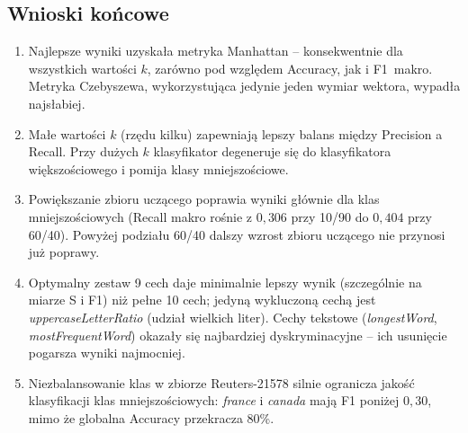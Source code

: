 \documentclass{article}
\begin{document}
\subsection{Wnioski końcowe}

\begin{enumerate}
    \item Najlepsze wyniki uzyskała metryka Manhattan -- konsekwentnie dla
    wszystkich wartości $k$, zarówno pod względem Accuracy, jak i F1~makro.
    Metryka Czebyszewa, wykorzystująca jedynie jeden wymiar wektora, wypadła
    najsłabiej.
    \item Małe wartości $k$ (rzędu kilku) zapewniają lepszy balans między
    Precision a Recall. Przy dużych $k$ klasyfikator degeneruje się do
    klasyfikatora większościowego i pomija klasy mniejszościowe.
    \item Powiększanie zbioru uczącego poprawia wyniki głównie dla klas
    mniejszościowych (Recall makro rośnie z $0{,}306$ przy 10/90 do $0{,}404$
    przy 60/40). Powyżej podziału 60/40 dalszy wzrost zbioru uczącego nie
    przynosi już poprawy.
    \item Optymalny zestaw 9 cech daje minimalnie lepszy wynik (szczególnie na miarze
    S i F1) niż pełne 10 cech; jedyną wykluczoną cechą jest
    \textit{uppercaseLetterRatio} (udział wielkich liter). Cechy tekstowe (\textit{longestWord}, \textit{mostFrequentWord}) okazały się
    najbardziej dyskryminacyjne -- ich usunięcie pogarsza wyniki najmocniej.
    \item Niezbalansowanie klas w zbiorze Reuters-21578 silnie ogranicza jakość
    klasyfikacji klas mniejszościowych: \textit{france} i \textit{canada} mają
    F1 poniżej $0{,}30$, mimo że globalna Accuracy przekracza 80\%.
\end{enumerate}
\end{document}

